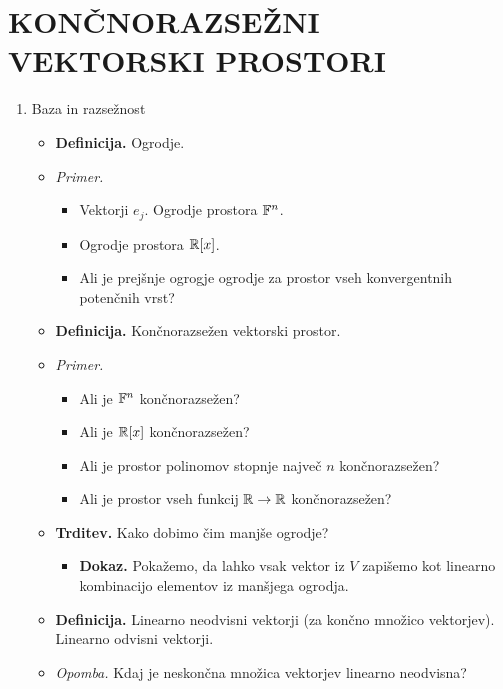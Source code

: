 \section{KONČNORAZSEŽNI VEKTORSKI PROSTORI}

\begin{enumerate}

    \item Baza in razsežnost
    \begin{itemize}
        \item \colorbox{purple!30}{\textbf{Definicija.}} Ogrodje.
        \item \colorbox{yellow!30}{\emph{Primer.}}       
        \begin{itemize}
            \item Vektorji $e_j$. Ogrodje prostora $\mathbb{F}^n$.
            \item Ogrodje prostora $\mathbb{R}[x]$.
            \item Ali je prejšnje ogrogje ogrodje za prostor vseh konvergentnih potenčnih vrst?
        \end{itemize}
        \item \colorbox{purple!30}{\textbf{Definicija.}} Končnorazsežen vektorski prostor.
        \item \colorbox{yellow!30}{\emph{Primer.}}       
        \begin{itemize}
            \item Ali je $\mathbb{F}^n$ končnorazsežen?
            \item Ali je $\mathbb{R}[x]$ končnorazsežen?
            \item Ali je prostor polinomov stopnje največ $n$ končnorazsežen?
            \item Ali je prostor vseh funkcij $\mathbb{R} \to \mathbb{R}$ končnorazsežen?
        \end{itemize}
        \item \colorbox{blue!30}{\textbf{Trditev.}} Kako dobimo čim manjše ogrodje?
        \begin{itemize}
            \item \colorbox{green!30}{\textbf{Dokaz.}} Pokažemo, da lahko vsak vektor iz $V$ zapišemo kot linearno kombinacijo elementov iz manšjega ogrodja.
        \end{itemize}
        \item \colorbox{purple!30}{\textbf{Definicija.}} Linearno neodvisni vektorji (za končno množico vektorjev). Linearno odvisni vektorji.
        \item \colorbox{yellow!30}{\emph{Opomba.}} Kdaj je neskončna množica vektorjev linearno neodvisna?

\end{itemize}
\end{enumerate}
